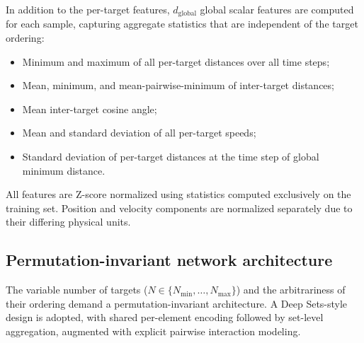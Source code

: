 \documentclass[a4paper,fleqn]{cas-dc}
\begin{document}
In addition to the per-target features, $d_{\text{global}}$ global scalar features are computed for each sample, capturing aggregate statistics that are independent of the target ordering:

\begin{itemize}
    \item Minimum and maximum of all per-target distances over all time steps;
    \item Mean, minimum, and mean-pairwise-minimum of inter-target distances;
    \item Mean inter-target cosine angle;
    \item Mean and standard deviation of all per-target speeds;
    \item Standard deviation of per-target distances at the time step of global minimum distance.
\end{itemize}

All features are Z-score normalized using statistics computed exclusively on the training set. Position and velocity components are normalized separately due to their differing physical units.

\subsection{Permutation-invariant network architecture}

The variable number of targets ($N \in \{N_{\min}, \dots, N_{\max}\}$) and the arbitrariness of their ordering demand a permutation-invariant architecture. A Deep Sets-style \cite{zaheer2017deep} design is adopted, with shared per-element encoding followed by set-level aggregation, augmented with explicit pairwise interaction modeling.
\end{document}

